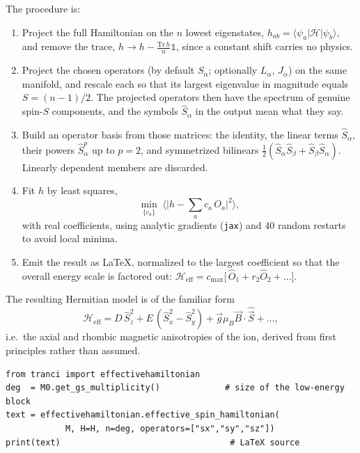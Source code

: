 \documentclass[11pt,a4paper]{article}
\newcommand{\op}[1]{\texttt{#1}}
\begin{document}
The procedure is:
\begin{enumerate}
\item Project the full Hamiltonian on the $n$ lowest eigenstates,
      $h_{ab}=\langle\psi_a|\mathcal{H}|\psi_b\rangle$, and remove the trace,
      $h \rightarrow h - \frac{\mathrm{Tr}\,h}{n}\mathbb{1}$, since a constant
      shift carries no physics.
\item Project the chosen operators (by default $S_\alpha$; optionally
      $L_\alpha$, $J_\alpha$) on the same manifold, and rescale each so that its
      largest eigenvalue in magnitude equals $S=(n-1)/2$.  The projected
      operators then have the spectrum of genuine spin-$S$ components, and the
      symbols $\hat S_\alpha$ in the output mean what they say.
\item Build an operator basis from those matrices: the identity, the linear
      terms $\hat S_\alpha$, their powers $\hat S_\alpha^p$ up to $p=2$, and
      symmetrized bilinears
      $\tfrac12(\hat S_\alpha \hat S_\beta + \hat S_\beta \hat S_\alpha)$.
      Linearly dependent members are discarded.
\item Fit $h$ by least squares,
      \begin{equation}
        \min_{\{c_a\}}\;
        \Big\langle \big| h - \textstyle\sum_a c_a\,O_a \big|^2 \Big\rangle ,
      \end{equation}
      with real coefficients, using analytic gradients (\op{jax}) and $40$
      random restarts to avoid local minima.
\item Emit the result as \LaTeX, normalized to the largest coefficient so that
      the overall energy scale is factored out:
      $\mathcal{H}_{\mathrm{eff}} = c_{\max}\big[\,\hat O_1 + r_2 \hat O_2 +
      \ldots\big]$.
\end{enumerate}

The resulting Hermitian model is of the familiar form
\begin{equation}
  \mathcal{H}_{\mathrm{eff}}
  = D\,\hat S_z^2 + E\,(\hat S_x^2-\hat S_y^2)
  + \vec{g}\mu_B\vec{B}\cdot\hat{\vec{S}} + \ldots ,
\end{equation}
i.e.\ the axial and rhombic magnetic anisotropies of the ion, derived from first
principles rather than assumed.

\begin{lstlisting}
from tranci import effectivehamiltonian
deg  = M0.get_gs_multiplicity()             # size of the low-energy block
text = effectivehamiltonian.effective_spin_hamiltonian(
            M, H=H, n=deg, operators=["sx","sy","sz"])
print(text)                                  # LaTeX source
\end{lstlisting}
\end{document}
